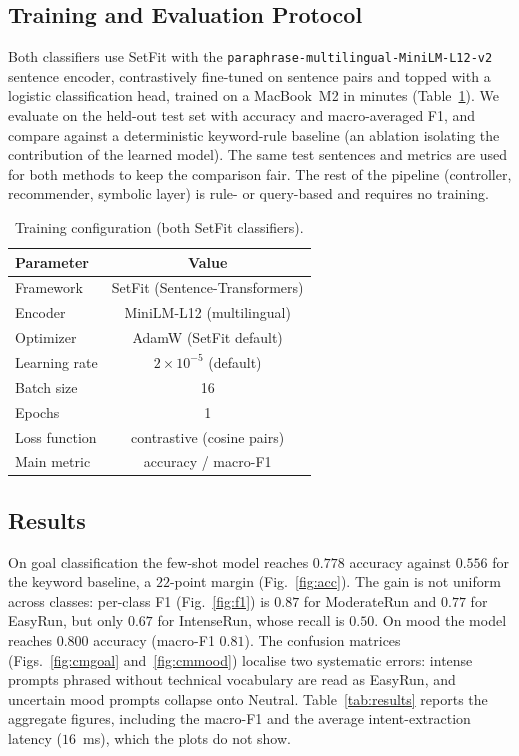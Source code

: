 \documentclass[11pt,a4paper]{article}
\begin{document}
	\subsection{Training and Evaluation Protocol}

	Both classifiers use SetFit with the \texttt{paraphrase-multilingual-MiniLM-L12-v2} sentence encoder, contrastively fine-tuned on sentence pairs and topped with a logistic classification head, trained on a MacBook~M2 in minutes (Table~\ref{tab:training}). We evaluate on the held-out test set with accuracy and macro-averaged F1, and compare against a deterministic keyword-rule baseline (an ablation isolating the contribution of the learned model). The same test sentences and metrics are used for both methods to keep the comparison fair. The rest of the pipeline (controller, recommender, symbolic layer) is rule- or query-based and requires no training.

	\begin{table}[h]
		\centering
		\caption{Training configuration (both SetFit classifiers).}
		\label{tab:training}
		\begin{tabular}{|l|c|}
			\hline
			\textbf{Parameter} & \textbf{Value} \\
			\hline
			Framework & SetFit (Sentence-Transformers) \\
			Encoder & MiniLM-L12 (multilingual) \\
			Optimizer & AdamW (SetFit default) \\
			Learning rate & $2\times10^{-5}$ (default) \\
			Batch size & 16 \\
			Epochs & 1 \\
			Loss function & contrastive (cosine pairs) \\
			Main metric & accuracy / macro-F1 \\
			\hline
		\end{tabular}
	\end{table}

	\subsection{Results}

	On goal classification the few-shot model reaches $0.778$ accuracy against $0.556$ for the keyword baseline, a $22$-point margin (Fig.~\ref{fig:acc}). The gain is not uniform across classes: per-class F1 (Fig.~\ref{fig:f1}) is $0.87$ for ModerateRun and $0.77$ for EasyRun, but only $0.67$ for IntenseRun, whose recall is $0.50$. On mood the model reaches $0.800$ accuracy (macro-F1 $0.81$). The confusion matrices (Figs.~\ref{fig:cmgoal} and~\ref{fig:cmmood}) localise two systematic errors: intense prompts phrased without technical vocabulary are read as EasyRun, and uncertain mood prompts collapse onto Neutral. Table~\ref{tab:results} reports the aggregate figures, including the macro-F1 and the average intent-extraction latency ($16$~ms), which the plots do not show.
\end{document}
